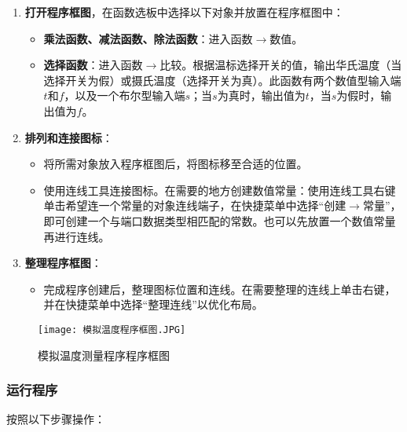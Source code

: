 \documentclass[UTF-8,twoside,cs4size]{ctexart}
\begin{document}
\begin{enumerate}
    \item \textbf{打开程序框图}，在函数选板中选择以下对象并放置在程序框图中：
    \begin{itemize}
        \item \textbf{乘法函数、减法函数、除法函数}：进入函数$\rightarrow$数值。
        \item \textbf{选择函数}：进入函数$\rightarrow$比较。根据温标选择开关的值，输出华氏温度（当选择开关为假）或摄氏温度（选择开关为真）。此函数有两个数值型输入端$t$和$f$，以及一个布尔型输入端$s$；当$s$为真时，输出值为$t$，当$s$为假时，输出值为$f$。
    \end{itemize}
    
    \item \textbf{排列和连接图标}：
    \begin{itemize}
        \item 将所需对象放入程序框图后，将图标移至合适的位置。
        \item 使用连线工具连接图标。在需要的地方创建数值常量：使用连线工具右键单击希望连一个常量的对象连线端子，在快捷菜单中选择“创建$\rightarrow$常量”，即可创建一个与端口数据类型相匹配的常数。也可以先放置一个数值常量再进行连线。
    \end{itemize}

    \item \textbf{整理程序框图}：
    \begin{itemize}
        \item 完成程序创建后，整理图标位置和连线。在需要整理的连线上单击右键，并在快捷菜单中选择“整理连线”以优化布局。
    \end{itemize}
    
\end{enumerate}
\begin{figure}[!h]
    \centering
    \texttt{[image: 模拟温度程序框图.JPG]}
    \caption{模拟温度测量程序程序框图}
\end{figure}

\subsubsection{运行程序}
按照以下步骤操作：
\end{document}
